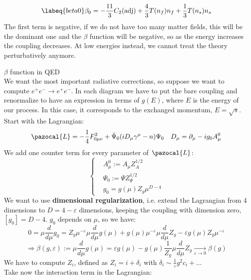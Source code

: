\documentclass[../main.tex]{subfiles}
\begin{document}
\begin{equation}
\labeq{beta0}
\beta_0=-\frac{11}{3}C_2(\text{adj})+\frac{4}{3}T(n_f)n_f+\frac{1}{3}T(n_s)n_s
\end{equation}
The first term is negative, if we do not have too many matter fields, this will be the dominant one and the $\beta$ function will be negative, so as the energy increases the coupling decreases. At low energies instead, we cannot treat the theory perturbatively anymore.
\begin{example}$\beta$ function in QED\\
We want the most important radiative corrections, so suppose we want to compute $e^+e^-\to e^+e^-$.
In each diagram we have to put the bare coupling and renormalize to have an expression in terms of $g(E)$, where $E$ is the energy of our process. In this case, it corresponds to the exchanged momentum, $E=\sqrt{s}$. Start with the Lagrangian:
\[
\pazocal{L}=-\frac{1}{4}F^2_{0\mu\nu}+\Bar{\Psi}_0(iD_\mu\gamma^\mu-n)\Psi_0 \quad D_\mu=\partial_\mu-ig_0A_\mu^0
\]
We add one counter term for every parameter of $\pazocal{L}$:
\[
\left\{
\begin{aligned}
&A_\mu^0:=A_\mu Z_A^{1/2}\\
&\Psi_0:=\Psi Z_\Psi^{1/2}\\
&g_0=g(\mu)Z_g\mu^{D-4}
\end{aligned}
\right.
\]
We want to use \textbf{dimensional regularization}, i.e. extend the Lagrangian from 4 dimensions to $D=4-\varepsilon$ dimensions, keeping the coupling with dimension zero, $[g_0]=D-4$. $g_0$ depends on $\mu$, so we have:
\[
0=\mu\frac{d}{d\mu}g_0=Z_g\mu^{-\varepsilon}\mu\frac{d}{d\mu}g(\mu)+g(\mu)\mu^{-\varepsilon}\mu\frac{d}{d\mu}Z_g-\varepsilon g(\mu)Z_g\mu^{-\varepsilon}
\]
\[
\Rightarrow\beta(g,\varepsilon):=\mu\frac{d}{d\mu}g(\mu)=\varepsilon g(\mu)-g(\mu)\frac{1}{Z_g}\mu\frac{d}{d\mu}Z_g\xrightarrow[\varepsilon\to0]{}\beta(g)
\]
We have to compute $Z_i$, defined as $Z_i=i+\delta_i$ with $\delta_i\sim\frac{1}{\varepsilon}g^2c_i+\dots$\\ Take now the interaction term in the Lagrangian:

\end{example}
\end{document}
